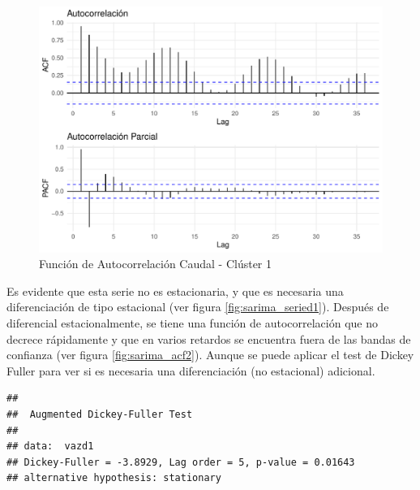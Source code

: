 \documentclass[12pt,oneside]{book}\usepackage[]{graphicx}\usepackage[]{color}
\makeatletter
\def\maxwidth{ %
  \ifdim\Gin@nat@width>\linewidth
    \linewidth
  \else
    \Gin@nat@width
  \fi
}
\newenvironment{kframe}{%
 \def\at@end@of@kframe{}%
 \ifinner\ifhmode%
  \def\at@end@of@kframe{\end{minipage}}%
  \begin{minipage}{\columnwidth}%
 \fi\fi%
 \def\FrameCommand##1{\hskip\@totalleftmargin \hskip-\fboxsep
 \colorbox{shadecolor}{##1}\hskip-\fboxsep
     \hskip-\linewidth \hskip-\@totalleftmargin \hskip\columnwidth}%
 \MakeFramed {\advance\hsize-\width
   \@totalleftmargin\z@ \linewidth\hsize
   \@setminipage}}%
 {\par\unskip\endMakeFramed%
 \at@end@of@kframe}
\newenvironment{knitrout}{}{} %
\theoremstyle{definition} %
\makeatother
\begin{document}
\begin{knitrout}
\color{fgcolor}\begin{figure}[H]

{\centering \includegraphics[width=\maxwidth]{figure/unnamed-chunk-8-1} 

}

\caption{\label{fig:sarima_acf} Función de Autocorrelación Caudal - Clúster 1}\label{fig:unnamed-chunk-8}
\end{figure}


\end{knitrout}







Es evidente que esta serie no es estacionaria, y que es necesaria una diferenciación de tipo estacional (ver figura \ref{fig:sarima_seried1}). Después de diferencial estacionalmente, se tiene una función de autocorrelación que no decrece rápidamente y que en varios retardos se encuentra fuera de las bandas de confianza (ver figura \ref{fig:sarima_acf2}). Aunque se puede aplicar el test de Dickey Fuller para ver si es necesaria una diferenciación (no estacional) adicional.


\begin{knitrout}
\color{fgcolor}\begin{kframe}
\begin{verbatim}
## 
## 	Augmented Dickey-Fuller Test
## 
## data:  vazd1
## Dickey-Fuller = -3.8929, Lag order = 5, p-value = 0.01643
## alternative hypothesis: stationary
\end{verbatim}
\end{kframe}
\end{knitrout}
\label{tab:dfuller}
\end{document}
